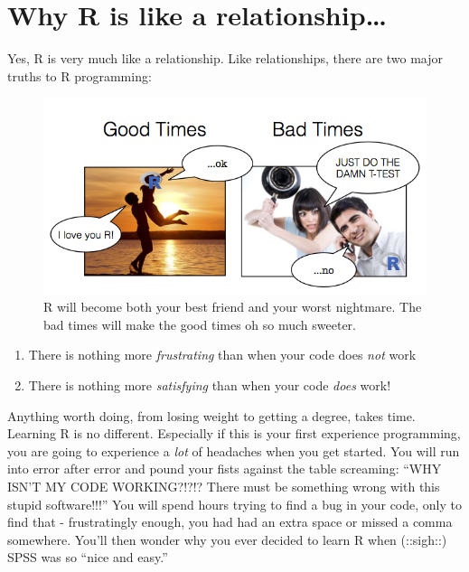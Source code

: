\documentclass[
]{book}
\begin{document}
\hypertarget{rrelationship}{%
\section{Why R is like a relationship\ldots{}}\label{rrelationship}}

Yes, R is very much like a relationship. Like relationships, there are two major truths to R programming:

\begin{figure}

\includegraphics[width=8.75in]{images/rrelationship} \hfill{}

\caption{R will become both your best friend and your worst nightmare. The bad times will make the good times oh so much sweeter.}\label{fig:relationship}
\end{figure}

\begin{enumerate}
\def\labelenumi{\arabic{enumi}.}
\item
  There is nothing more \emph{frustrating} than when your code does \emph{not} work
\item
  There is nothing more \emph{satisfying} than when your code \emph{does} work!
\end{enumerate}

Anything worth doing, from losing weight to getting a degree, takes time. Learning R is no different. Especially if this is your first experience programming, you are going to experience a \emph{lot} of headaches when you get started. You will run into error after error and pound your fists against the table screaming: ``WHY ISN'T MY CODE WORKING?!?!? There must be something wrong with this stupid software!!!'' You will spend hours trying to find a bug in your code, only to find that - frustratingly enough, you had had an extra space or missed a comma somewhere. You'll then wonder why you ever decided to learn R when (::sigh::) SPSS was so ``nice and easy.''
\end{document}
